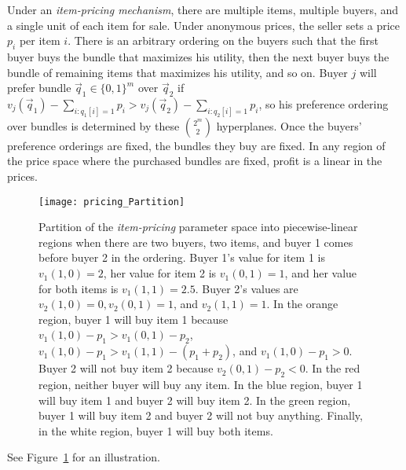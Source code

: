\begin{example}\label{ex:item_pricing}
Under an \emph{item-pricing mechanism}, there are multiple items, multiple buyers, and a single unit of each item for sale. 
Under anonymous prices, the seller sets a price $p_i$ per item $i$. There is an arbitrary ordering on the buyers such that the first buyer buys the bundle that maximizes his utility, then the next buyer buys the bundle of remaining items that maximizes his utility, and so on.
Buyer $j$ will prefer bundle $\vec{q}_1 \in \{0,1\}^m$ over $\vec{q}_2$ if $v_j(\vec{q}_1) - \sum_{i: q_1[i] = 1} p_i > v_j(\vec{q}_2) - \sum_{i: q_2[i] = 1} p_i$, so his preference ordering over bundles is determined by these ${2^m \choose 2}$ hyperplanes. Once the buyers' preference orderings are fixed, the bundles they buy are fixed. In any region of the price space where the purchased bundles are fixed, profit is a linear in the prices.
\begin{figure}
	\texttt{[image: pricing\_Partition]}\centering
	\caption{Partition of the \emph{item-pricing} parameter space into piecewise-linear regions when there are two buyers, two items, and buyer 1 comes before buyer 2 in the ordering. Buyer 1's value for item 1 is $v_1(1,0) = 2$, her value for item 2 is $v_1(0, 1) = 1$, and her value for both items is $v_1(1,1) = 2.5$. Buyer 2's values are $v_2(1, 0) = 0, v_2(0, 1) = 1$, and $v_2(1, 1) = 1$. In the orange region, buyer 1 will buy item 1 because $v_1(1, 0) - p_1 > v_1(0,1) - p_2$, $v_1(1, 0) - p_1 > v_1(1,1) - (p_1 + p_2)$, and $v_1(1, 0) - p_1 > 0$. Buyer 2 will not buy item 2 because $v_2(0, 1) - p_2 < 0$. In the red region, neither buyer will buy any item. In the blue region, buyer 1 will buy item 1 and buyer 2 will buy item 2. In the green region, buyer 1 will buy item 2 and buyer 2 will not buy anything. Finally, in the white region, buyer 1 will buy both items.
	}
	\label{fig:pricing}
\end{figure}
See Figure~\ref{fig:pricing} for an illustration.
\end{example}

